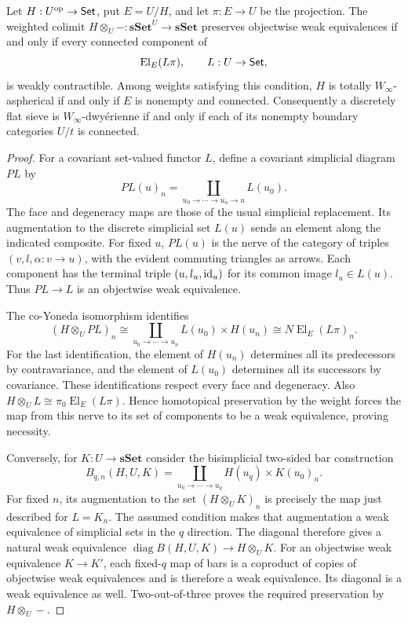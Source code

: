 \begin{proposition}\label{F:DF-actions}
Let $H:U^{\mathrm{op}}\to\mathsf{Set}$, put $E=U/H$, and let
$\pi:E\to U$ be the projection. The weighted colimit
$H\otimes_U-:\mathbf{sSet}^{U}\to\mathbf{sSet}$
preserves objectwise weak equivalences if and only if
every connected component of
\[
 \operatorname{El}_{E}(L\pi),\qquad L:U\to\mathsf{Set},
\]
is weakly contractible. Among weights satisfying this
condition, $H$ is totally $W_\infty$-aspherical if and
only if $E$ is nonempty and connected. Consequently a
discretely flat sieve is $W_\infty$-dwy\'erienne if and
only if each of its nonempty boundary categories $U/t$
is connected.
\end{proposition}

\begin{proof}
For a covariant set-valued functor $L$, define a
covariant simplicial diagram $PL$ by
\[
 PL(u)_n=
 \coprod_{u_0\to\cdots\to u_n\to u}L(u_0).
\]
The face and degeneracy maps are those of the usual
simplicial replacement. Its augmentation to the
discrete simplicial set $L(u)$ sends an element along
the indicated composite. For fixed $u$, $PL(u)$ is
the nerve of the category of triples
$(v,l,\alpha:v\to u)$, with the evident commuting
triangles as arrows. Each component has the terminal
triple $(u,l_u,\mathrm{id}_u)$ for its common image
$l_u\in L(u)$. Thus $PL\to L$ is an objectwise
weak equivalence.

The co-Yoneda isomorphism identifies
\[
 (H\otimes_U PL)_n
   \cong
 \coprod_{u_0\to\cdots\to u_n}
       L(u_0)\times H(u_n)
   \cong
 N\operatorname{El}_E(L\pi)_n.
\]
For the last identification, the element of $H(u_n)$
determines all its predecessors by contravariance,
and the element of $L(u_0)$ determines all its
successors by covariance. These identifications
respect every face and degeneracy. Also
$H\otimes_U L\cong\pi_0\operatorname{El}_E(L\pi)$.
Hence homotopical preservation by the weight forces
the map from this nerve to its set of components to
be a weak equivalence, proving necessity.

Conversely, for $K:U\to\mathbf{sSet}$ consider the
bisimplicial two-sided bar construction
\[
 B_{q,n}(H,U,K)=
 \coprod_{u_0\to\cdots\to u_q}
       H(u_q)\times K(u_0)_n.
\]
For fixed $n$, its augmentation to the set
$(H\otimes_U K)_n$ is precisely the map just
described for $L=K_n$. The assumed condition makes
that augmentation a weak equivalence of simplicial
sets in the $q$ direction. The diagonal therefore
gives a natural weak equivalence
$\operatorname{diag}B(H,U,K)\to H\otimes_U K$.
For an objectwise weak equivalence $K\to K'$, each
fixed-$q$ map of bars is a coproduct of copies of
objectwise weak equivalences and is therefore a weak
equivalence. Its diagonal is a weak equivalence as
well. Two-out-of-three proves the required
preservation by $H\otimes_U-$.


\end{proof}

